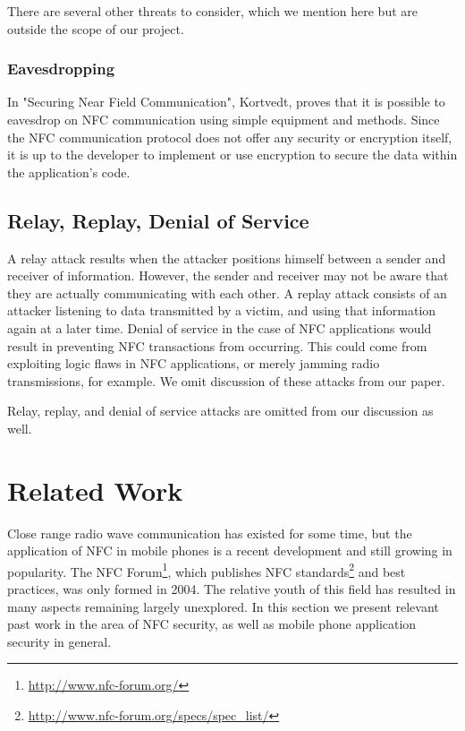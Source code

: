 \documentclass[12pt]{article}
\begin{document}
There are several other threats to consider, which we mention here but are outside the scope of our project.

\subsubsection{Eavesdropping}
In "Securing Near Field Communication"\cite{kortvedt2009}, Kortvedt, proves that it is possible to eavesdrop on NFC communication using simple equipment and methods.
Since the NFC communication protocol does not offer any security or encryption itself, it is up to the developer to implement or use encryption to secure the data within the application's code. 
\subsection{Relay, Replay, Denial of Service}
A relay attack results when the attacker positions himself between a sender and receiver of information.
However, the sender and receiver may not be aware that they are actually communicating with each other.
A replay attack consists of an attacker listening to data transmitted by a victim, and using that information again at a later time.
Denial of service in the case of NFC applications would result in preventing NFC transactions from occurring.
This could come from exploiting logic flaws in NFC applications, or merely jamming radio transmissions, for example.
We omit discussion of these attacks from our paper.

Relay, replay, and denial of service attacks are omitted from our discussion as well.

\section{Related Work}
Close range radio wave communication has existed for some time, but the application of NFC in mobile phones is a recent development and still growing in popularity.
The NFC Forum\footnote{\url{http://www.nfc-forum.org/}}, which publishes NFC standards\footnote{\url{http://www.nfc-forum.org/specs/spec_list/}} and best practices, was only formed in 2004.
The relative youth of this field has resulted in many aspects remaining largely unexplored.
In this section we present relevant past work in the area of NFC security, as well as mobile phone application security in general.
\end{document}
